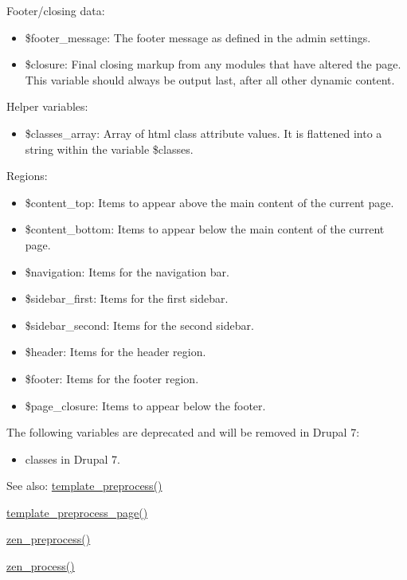 Footer/closing data:\begin{itemize}
\item \$footer\_\-message: The footer message as defined in the admin settings.\item \$closure: Final closing markup from any modules that have altered the page. This variable should always be output last, after all other dynamic content.\end{itemize}


Helper variables:\begin{itemize}
\item \$classes\_\-array: Array of html class attribute values. It is flattened into a string within the variable \$classes.\end{itemize}


Regions:\begin{itemize}
\item \$content\_\-top: Items to appear above the main content of the current page.\item \$content\_\-bottom: Items to appear below the main content of the current page.\item \$navigation: Items for the navigation bar.\item \$sidebar\_\-first: Items for the first sidebar.\item \$sidebar\_\-second: Items for the second sidebar.\item \$header: Items for the header region.\item \$footer: Items for the footer region.\item \$page\_\-closure: Items to appear below the footer.\end{itemize}


The following variables are deprecated and will be removed in Drupal 7:\begin{itemize}
\item {}
classes in Drupal 7.\end{itemize}


\begin{Desc}
\item[See also:]\hyperlink{includes_2theme_8inc_3eeb7bcdba7ef4859f99586da264d347}{template\_\-preprocess()} 

\hyperlink{includes_2theme_8inc_128dae24f990d8ba4710ac78b0584c11}{template\_\-preprocess\_\-page()} 

\hyperlink{sites_2all_2themes_2zen_2template_8php_34cb06c8098f8e1c710c501bb9a64d8b}{zen\_\-preprocess()} 

\hyperlink{sites_2all_2themes_2zen_2template_8php_3790b825810aa4bfd00c27c37817a7d8}{zen\_\-process()} \end{Desc}
